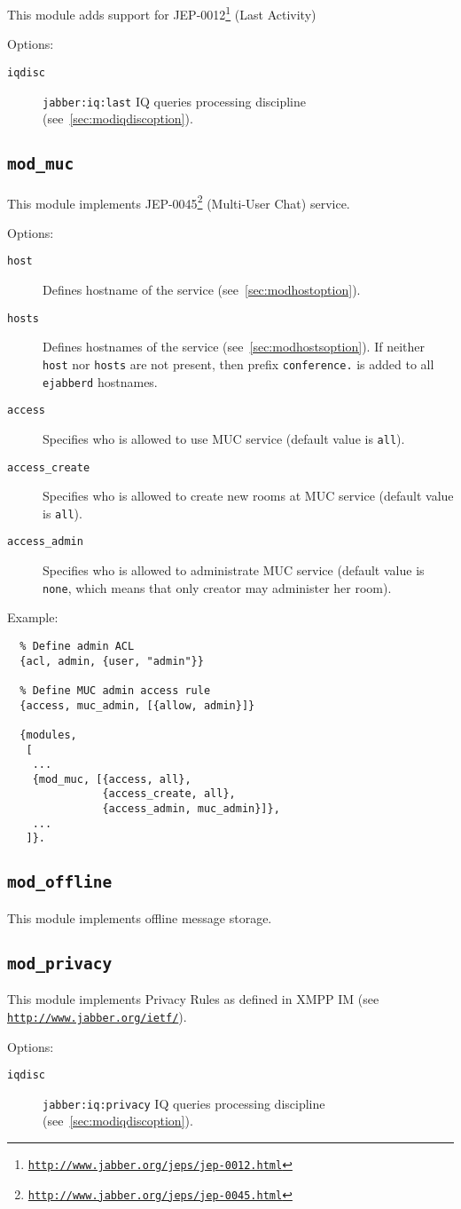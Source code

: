 \documentclass[a4paper,10pt]{article}
\newcommand{\bracehack}{\def\{{\char"7B}\def\}{\char"7D}}
\newcommand{\ns}[1]{\texttt{#1}}
\newcommand{\jid}[1]{\texttt{#1}}
\newcommand{\term}[1]{\texttt{#1}}
\newcommand{\ejabberd}{\texttt{ejabberd}}
\newcommand{\module}[1]{\texttt{#1}}
\newcommand{\modmuc}{\module{mod\_muc}}
\newcommand{\modoffline}{\module{mod\_offline}}
\newcommand{\modprivacy}{\module{mod\_privacy}}
\newcommand{\titem}[1]{\item[\bracehack\texttt{#1}]}
\gdef\ahrefurl#1{\href{#1}{\texttt{#1}}}
\gdef\footahref#1#2{#2\footnote{\href{#1}{\texttt{#1}}}}
\newcommand{\tjepref}[2]{\footahref{http://www.jabber.org/jeps/jep-#1.html}{#2}}
\newcommand{\jepref}[1]{\tjepref{#1}{JEP-#1}}
\newcommand{\iqdiscitem}[1]{\titem{iqdisc} #1 IQ queries processing
discipline (see~\ref{sec:modiqdiscoption}).}
\newcommand{\hostitem}[1]{
  \titem{host} Defines hostname of the service
  (see~\ref{sec:modhostoption}).
  \titem{hosts} Defines hostnames of the service
  (see~\ref{sec:modhostsoption}).  If neither \texttt{host} nor \texttt{hosts}
  are not present, then prefix \jid{#1.} is added to all \ejabberd{} hostnames.
}
\begin{document}
This module adds support for \jepref{0012} (Last Activity)

Options:
\begin{description}
\iqdiscitem{\ns{jabber:iq:last}}
\end{description}


\subsection{\modmuc{}}
\label{sec:modmuc}

This module implements \jepref{0045} (Multi-User Chat) service.

Options:
\begin{description}
\hostitem{conference}
\titem{access} Specifies who is allowed to use MUC service (default value is \term{all}).
\titem{access\_create} Specifies who is allowed to create new rooms at
  MUC service (default value is \term{all}).
\titem{access\_admin} Specifies who is allowed to administrate MUC service
(default value is \term{none}, which means that only creator may administer her room).
\end{description}

Example:
\begin{verbatim}
  % Define admin ACL
  {acl, admin, {user, "admin"}}

  % Define MUC admin access rule
  {access, muc_admin, [{allow, admin}]}

  {modules,
   [
    ...
    {mod_muc, [{access, all},
               {access_create, all},
               {access_admin, muc_admin}]},
    ...
   ]}.
\end{verbatim}


\subsection{\modoffline{}}
\label{sec:modoffline}

This module implements offline message storage.


\subsection{\modprivacy{}}
\label{sec:modprivacy}

This module implements Privacy Rules as defined in XMPP IM
(see \ahrefurl{http://www.jabber.org/ietf/}).

Options:
\begin{description}
\iqdiscitem{\ns{jabber:iq:privacy}}
\end{description}
\end{document}
